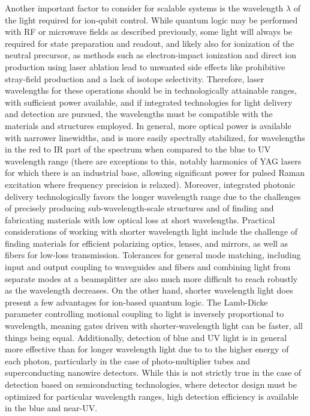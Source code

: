 \documentclass[%
reprint,
 amsmath,amssymb,
]{revtex4-1}
\begin{document}
Another important factor to consider for scalable systems is the wavelength $\lambda$ of the light required for ion-qubit control.  While quantum logic may be performed with RF or microwave fields as described previously, some light will always be required for state preparation and readout, and likely also for ionization of the neutral precursor, as methods such as electron-impact ionization and direct ion production using laser ablation lead to unwanted side effects like prohibitive stray-field production and a lack of isotope selectivity.  Therefore, laser wavelengths for these operations should be in technologically attainable ranges, with sufficient power available, and if integrated technologies for light delivery and detection are pursued, the wavelengths must be compatible with the materials and structures employed.  In general, more optical power is available with narrower linewidths, and is more easily spectrally stabilized, for wavelengths in the red to IR part of the spectrum when compared to the blue to UV wavelength range (there are exceptions to this, notably harmonics of YAG lasers for which there is an industrial base, allowing significant power for pulsed Raman excitation where frequency precision is relaxed).  Moreover, integrated photonic delivery technologically favors the longer wavelength range due to the challenges of precisely producing sub-wavelength-scale structures and of finding and fabricating materials with low optical loss at short wavelengths.  Practical considerations of working with shorter wavelength light include the challenge of finding materials for efficient polarizing optics, lenses, and mirrors, as well as fibers for low-loss transmission.  Tolerances for general mode matching, including input and output coupling to waveguides and fibers and combining light from separate modes at a beamsplitter are also much more difficult to reach robustly as the wavelength decreases.  On the other hand, shorter wavelength light does present a few advantages for ion-based quantum logic.  The Lamb-Dicke parameter controlling motional coupling to light is inversely proportional to wavelength, meaning gates driven with shorter-wavelength light can be faster, all things being equal.  Additionally, detection of blue and UV light is in general more effective than for longer wavelength light due to to the higher energy of each photon, particularly in the case of photo-multiplier tubes and superconducting nanowire detectors.  While this is not strictly true in the case of detection based on semiconducting technologies, where detector design must be optimized for particular wavelength ranges, high detection efficiency is available in the blue and near-UV.
\end{document}
